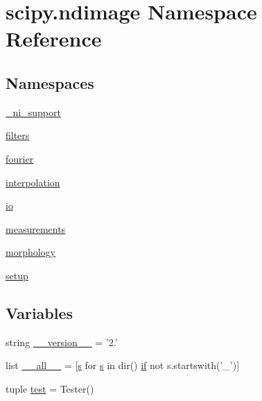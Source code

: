 \hypertarget{namespacescipy_1_1ndimage}{}\section{scipy.\+ndimage Namespace Reference}
\label{namespacescipy_1_1ndimage}
\subsection*{Namespaces}
\begin{DoxyCompactItemize}
\item 
 \hyperlink{namespacescipy_1_1ndimage_1_1__ni__support}{\+\_\+ni\+\_\+support}
\item 
 \hyperlink{namespacescipy_1_1ndimage_1_1filters}{filters}
\item 
 \hyperlink{namespacescipy_1_1ndimage_1_1fourier}{fourier}
\item 
 \hyperlink{namespacescipy_1_1ndimage_1_1interpolation}{interpolation}
\item 
 \hyperlink{namespacescipy_1_1ndimage_1_1io}{io}
\item 
 \hyperlink{namespacescipy_1_1ndimage_1_1measurements}{measurements}
\item 
 \hyperlink{namespacescipy_1_1ndimage_1_1morphology}{morphology}
\item 
 \hyperlink{namespacescipy_1_1ndimage_1_1setup}{setup}
\end{DoxyCompactItemize}
\subsection*{Variables}
\begin{DoxyCompactItemize}
\item 
string \hyperlink{namespacescipy_1_1ndimage_adaa87b576cea55ab6bcf02ea3a9d82aa}{\+\_\+\+\_\+version\+\_\+\+\_\+} = '2.'
\item 
list \hyperlink{namespacescipy_1_1ndimage_a3157393e70fe2b865c39df03f3abab9b}{\+\_\+\+\_\+all\+\_\+\+\_\+} = \mbox{[}\hyperlink{indexexpr_8h_ae024b0db549122b44c349ae28ec990dc}{s} for \hyperlink{indexexpr_8h_ae024b0db549122b44c349ae28ec990dc}{s} in dir() \hyperlink{minmax_8h_a30a0ee9fee303f01d9c5e6f669e0dfe9}{if} not s.\+startswith('\+\_\+')\mbox{]}
\item 
tuple \hyperlink{namespacescipy_1_1ndimage_a5e868031feea4e6814b1a39a42cc793a}{test} = Tester()
\end{DoxyCompactItemize}


